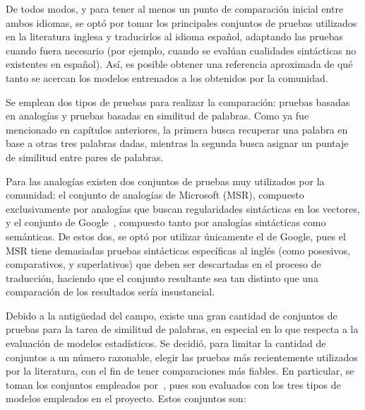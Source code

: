 De todos modos, y para tener al menos un punto de comparación inicial entre ambos idiomas, se optó
por tomar los principales conjuntos de pruebas utilizados en la literatura inglesa y traducirlos al
idioma español, adaptando las pruebas cuando fuera necesario (por ejemplo, cuando se evalúan
cualidades sintácticas no existentes en español). Así, es posible obtener una referencia aproximada
de qué tanto se acercan los modelos entrenados a los obtenidos por la comunidad.

Se emplean dos tipos de pruebas para realizar la comparación: pruebas basadas en analogías y pruebas
basadas en similitud de palabras. Como ya fue mencionado en capítulos anteriores, la primera busca
recuperar una palabra en base a otras tres palabras dadas, mientras la segunda busca asignar un
puntaje de similitud entre pares de palabras.

Para las analogías existen dos conjuntos de pruebas muy utilizados por la comunidad: el conjunto de
analogías de Microsoft (MSR), compuesto exclusivamente por analogías que buscan regularidades
sintácticas en los vectores, y el conjunto de Google~\cite{Mikolov2013a}, compuesto tanto por
analogías sintácticas como semánticas. De estos dos, se optó por utilizar únicamente el de Google,
pues el MSR tiene demasiadas pruebas sintácticas específicas al inglés (como posesivos,
comparativos, y superlativos) que deben ser descartadas en el proceso de traducción, haciendo que el
conjunto resultante sea tan distinto que una comparación de los resultados sería insustancial.

Debido a la antigüedad del campo, existe una gran cantidad de conjuntos de pruebas para la tarea de
similitud de palabras, en especial en lo que respecta a la evaluación de modelos estadísticos. Se
decidió, para limitar la cantidad de conjuntos a un número razonable, elegir las pruebas más
recientemente utilizados por la literatura, con el fin de tener comparaciones más fiables. En
particular, se toman los conjuntos empleados por~\cite{Levy2015}, pues son evaluados con los tres
tipos de modelos empleados en el proyecto. Estos conjuntos son:

